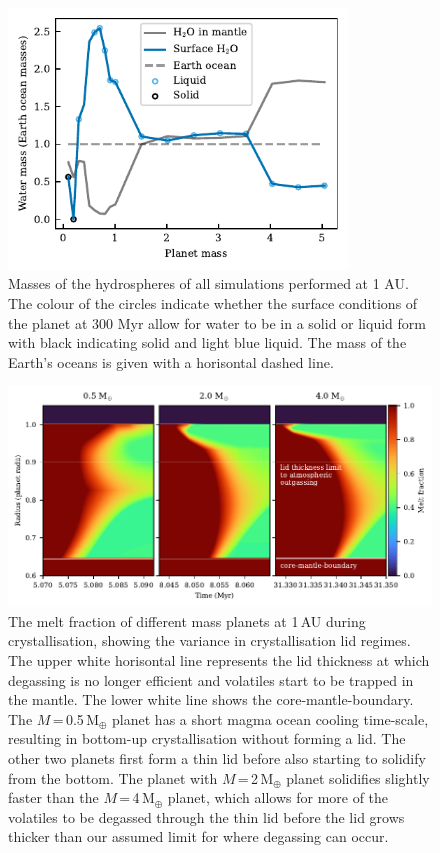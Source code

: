 \documentclass[bibyear,tradiabstract]{aa}
\begin{document}
\begin{figure}
\centering
\includegraphics[width=9cm]{water_medium.pdf}
   \caption{Masses of the hydrospheres of all simulations performed at 1 AU. The colour of the circles indicate whether the surface conditions of the planet at 300 Myr allow for water to be in a solid or liquid form with black indicating solid and light blue liquid. The mass of the Earth's oceans is given with a horisontal dashed line.}
      \label{Fig:hydro}
\end{figure} 
\begin{figure}
\centering
\includegraphics[width=18cm]{crystallisationfig.pdf}
   \caption{The melt fraction of different mass planets at 1\,AU during crystallisation, showing the variance in crystallisation lid regimes. The upper white horisontal line represents the lid thickness at which degassing is no longer efficient and volatiles start to be trapped in the mantle. The lower white line shows the core-mantle-boundary. The $M$\,=\,0.5\,M$_{\oplus}$ planet has a short magma ocean cooling time-scale, resulting in bottom-up crystallisation without forming a lid. The other two planets first form a thin lid before also starting to solidify from the bottom. The planet with $M$\,=\,2\,M$_{\oplus}$ planet solidifies slightly faster than the $M$\,=\,4\,M$_{\oplus}$ planet, which allows for more of the volatiles to be degassed through the thin lid before the lid grows thicker than our assumed limit for where degassing can occur.}
      \label{Fig:crystallisation}
\end{figure}
\end{document}
